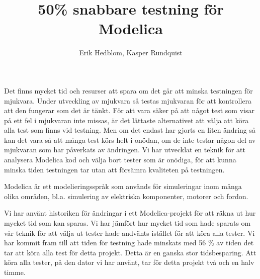 \documentclass{popsci}
\author{Erik Hedblom, Kasper Rundquist}
\title{50\% snabbare testning för Modelica}
\begin{document}


{\noindent Det finns mycket tid och resurser att spara om det går att minska testningen för mjukvara. Under utveckling av mjukvara så testas mjukvaran för att kontrollera att den fungerar som det är tänkt. För att vara säker på att något test som visar på ett fel i mjukvaran inte missas, är det lättaste alternativet att välja att köra alla test som finns vid testning. Men om det endast har gjorts en liten ändring så kan det vara så att många test körs helt i onödan, om de inte testar någon del av mjukvaran som har påverkats av ändringen. Vi har utvecklat en teknik för att analysera Modelica kod och välja bort tester som är onödiga, för att kunna minska tiden testningen tar utan att försämra kvaliteten på testningen.

Modelica är ett modelieringsspråk som används för simuleringar inom många olika områden, bl.a. simulering av elektriska komponenter, motorer och fordon.

Vi har använt historiken för ändringar i ett Modelica-projekt för att räkna ut hur mycket tid som kan sparas. Vi har jämfört hur mycket tid som hade sparats om vår teknik för att välja ut tester hade andvänts istället för att köra alla tester. Vi har kommit fram till att tiden för testning hade minskats med 56 \% av tiden det tar att köra alla test för detta projekt. Detta är en ganska stor tidsbesparing. Att köra alla tester, på den dator vi har använt, tar för detta projekt två och en halv timme.
}
\end{document}
